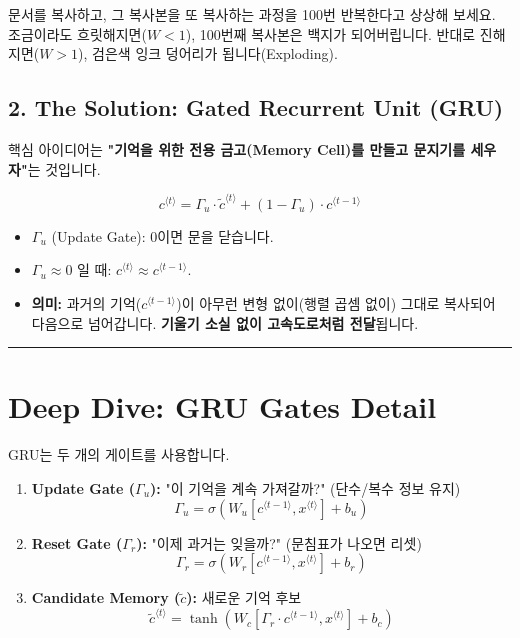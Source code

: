 \documentclass[11pt,a4paper]{book}
\theoremstyle{definition}
\begin{document}
\begin{analogybox}[title={복사본의 복사본}]
문서를 복사하고, 그 복사본을 또 복사하는 과정을 100번 반복한다고 상상해 보세요.
조금이라도 흐릿해지면($W < 1$), 100번째 복사본은 백지가 되어버립니다.
반대로 진해지면($W > 1$), 검은색 잉크 덩어리가 됩니다(Exploding).
\end{analogybox}

\subsection{2. The Solution: Gated Recurrent Unit (GRU)}
핵심 아이디어는 \textbf{"기억을 위한 전용 금고(Memory Cell)를 만들고 문지기를 세우자"}는 것입니다.

\begin{formulabox}[title={GRU의 핵심 수식}]
$$ c^{\langle t \rangle} = \Gamma_u \cdot \tilde{c}^{\langle t \rangle} + (1 - \Gamma_u) \cdot c^{\langle t-1 \rangle} $$
\begin{itemize}
    \item $\Gamma_u$ (Update Gate): 0이면 문을 닫습니다.
    \item $\Gamma_u \approx 0$ 일 때: $c^{\langle t \rangle} \approx c^{\langle t-1 \rangle}$.
    \item \textbf{의미:} 과거의 기억($c^{\langle t-1 \rangle}$)이 아무런 변형 없이(행렬 곱셈 없이) 그대로 복사되어 다음으로 넘어갑니다. \textbf{기울기 소실 없이 고속도로처럼 전달}됩니다.
\end{itemize}
\end{formulabox}

\vspace{0.5cm}\hrule\vspace{0.5cm}

\section{Deep Dive: GRU Gates Detail}

GRU는 두 개의 게이트를 사용합니다.

\begin{enumerate}
    \item \textbf{Update Gate ($\Gamma_u$):} "이 기억을 계속 가져갈까?" (단수/복수 정보 유지)
    $$ \Gamma_u = \sigma(W_u[c^{\langle t-1 \rangle}, x^{\langle t \rangle}] + b_u) $$
    
    \item \textbf{Reset Gate ($\Gamma_r$):} "이제 과거는 잊을까?" (문침표가 나오면 리셋)
    $$ \Gamma_r = \sigma(W_r[c^{\langle t-1 \rangle}, x^{\langle t \rangle}] + b_r) $$
    
    \item \textbf{Candidate Memory ($\tilde{c}$):} 새로운 기억 후보
    $$ \tilde{c}^{\langle t \rangle} = \tanh(W_c[\Gamma_r \cdot c^{\langle t-1 \rangle}, x^{\langle t \rangle}] + b_c) $$
\end{enumerate}
\end{document}
